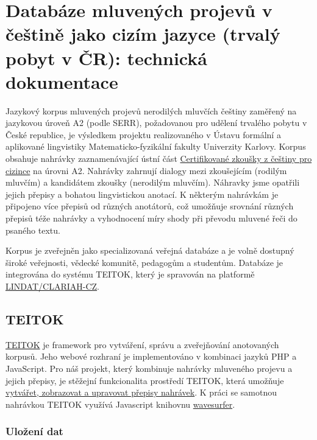 \documentclass[
]{article}
\author{}
\date{}
\begin{document}
\hypertarget{databuxe1ze-mluvenuxfdch-projevux16f-v-ux10deux161tinux11b-jako-cizuxedm-jazyce-trvaluxfd-pobyt-v-ux10dr-technickuxe1-dokumentace}{%
\section{Databáze mluvených projevů v češtině jako cizím jazyce (trvalý
pobyt v ČR): technická
dokumentace}\label{databuxe1ze-mluvenuxfdch-projevux16f-v-ux10deux161tinux11b-jako-cizuxedm-jazyce-trvaluxfd-pobyt-v-ux10dr-technickuxe1-dokumentace}}

Jazykový korpus mluvených projevů nerodilých mluvčích češtiny zaměřený
na jazykovou úroveň A2 (podle SERR), požadovanou pro udělení trvalého
pobytu v České republice, je výsledkem projektu realizovaného v Ústavu
formální a aplikované lingvistiky Matematicko-fyzikální fakulty
Univerzity Karlovy. Korpus obsahuje nahrávky zaznamenávající ústní část
\href{http://ujop.cuni.cz/cce}{Certifikované zkoušky z češtiny pro
cizince} na úrovni A2. Nahrávky zahrnují dialogy mezi zkoušejícím
(rodilým mluvčím) a kandidátem zkoušky (nerodilým mluvčím). Náhravky
jsme opatřili jejich přepisy a bohatou lingvistickou anotací. K některým
nahrávkám je připojeno více přepisů od různých anotátorů, což umožňuje
srovnání různých přepisů téže nahrávky a vyhodnocení míry shody při
převodu mluvené řeči do psaného textu.

Korpus je zveřejněn jako specializovaná veřejná databáze a je volně
dostupný široké veřejnosti, vědecké komunitě, pedagogům a studentům.
Databáze je integrována do systému TEITOK, který je spravován na
platformě \href{https://lindat.cz/}{LINDAT/CLARIAH-CZ}.

\hypertarget{teitok}{%
\subsection{TEITOK}\label{teitok}}

\href{http://teitok.corpuswiki.org/}{TEITOK} je framework pro vytváření,
správu a zveřejňování anotovaných korpusů. Jeho webové rozhraní je
implementováno v kombinaci jazyků PHP a JavaScript. Pro náš projekt,
který kombinuje nahrávky mluveného projevu a jejich přepisy, je stěžejní
funkcionalita prostředí TEITOK, která umožňuje
\href{http://www.teitok.org/index.php?action=help\&id=wavesurfer}{vytvářet,
zobrazovat a upravovat přepisy nahrávek}. K práci se samotnou nahrávkou
TEITOK využívá Javascript knihovnu
\href{http://wavesurfer-js.org/}{wavesurfer}.

\hypertarget{uloux17eenuxed-dat}{%
\subsubsection{Uložení dat}\label{uloux17eenuxed-dat}}
\end{document}
